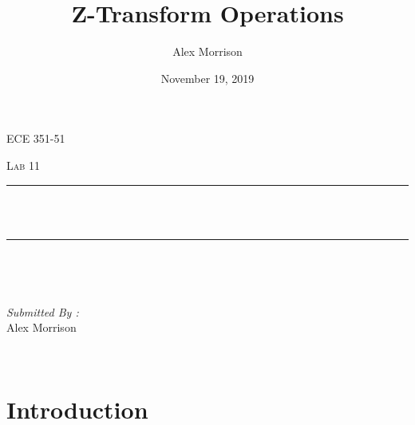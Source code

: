 \documentclass[12pt]{report}
\title{Z-Transform Operations}
\author{ Alex Morrison}
\date{November 19, 2019}
\makeatletter
\let\thetitle\@title
\makeatother
\begin{document}

\begin{titlepage}
	\centering
    \vspace*{0.5 cm}
\begin{center}    \textsc{\Large ECE 351-51}\\[2.0 cm]	\end{center}%
	\textsc{\Large  Lab 11}\\[0.5 cm]				%
	\rule{\linewidth}{0.2 mm} \\[0.4 cm]
	{ \huge \bfseries \thetitle}\\
	\rule{\linewidth}{0.2 mm} \\[1.5 cm]
	
	\begin{minipage}{0.4\textwidth}
		\begin{flushleft} \large
			\end{flushleft}
			\end{minipage}~
			\begin{minipage}{0.4\textwidth}
            
			\begin{flushright} \large
			\emph{Submitted By :} \\
			Alex Morrison  
		\end{flushright}
           
	\end{minipage}\\[2 cm]
	

    
    
    
    
	
\end{titlepage}


\tableofcontents
\pagebreak

\renewcommand{\thesection}{\arabic{section}}
\section{Introduction}
\end{document}
